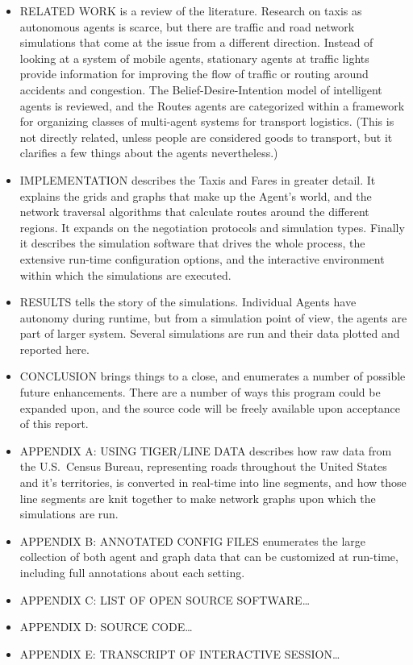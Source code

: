 \documentclass[11pt,letterpaper,onecolumn,twoside,openright,final]{report}
\begin{document}
\begin{itemize}
  \item{RELATED WORK is a review of the literature.
    Research on taxis as autonomous agents is scarce, but there are traffic and road network simulations that come at the issue from a different direction.
    Instead of looking at a system of mobile agents, stationary agents at traffic lights provide information for improving the flow of traffic or routing around accidents and congestion.
    The Belief-Desire-Intention model of intelligent agents is reviewed, and the Routes agents are categorized within a framework for organizing classes of multi-agent systems for transport logistics.
    (This is not directly related, unless people are considered goods to transport, but it clarifies a few things about the agents nevertheless.)}
  \item{IMPLEMENTATION describes the Taxis and Fares in greater detail.
    It explains the grids and graphs that make up the Agent's world, and the network traversal algorithms that calculate routes around the different regions.
    It expands on the negotiation protocols and simulation types.
    Finally it describes the simulation software that drives the whole process, the extensive run-time configuration options, and the interactive environment within which the simulations are executed.}
  \item{RESULTS tells the story of the simulations.
    Individual Agents have autonomy during runtime, but from a simulation point of view, the agents are part of larger system.
    Several simulations are run and their data plotted and reported here.}
  \item{CONCLUSION brings things to a close, and enumerates a number of possible future enhancements.
    There are a number of ways this program could be expanded upon, and the source code will be freely available upon acceptance of this report.}
  \item{APPENDIX A: USING TIGER/LINE DATA describes how raw data from the U.S.~Census Bureau, representing roads throughout the United States and it's territories, is converted in real-time into line segments, and how those line segments are knit together to make network graphs upon which the simulations are run.}
  \item{APPENDIX B: ANNOTATED CONFIG FILES enumerates the large collection of both agent and graph data that can be customized at run-time, including full annotations about each setting.}
  \item{APPENDIX C: LIST OF OPEN SOURCE SOFTWARE\ldots}
  \item{APPENDIX D: SOURCE CODE\ldots}
  \item{APPENDIX E: TRANSCRIPT OF INTERACTIVE SESSION\ldots}
\end{itemize}
\end{document}
